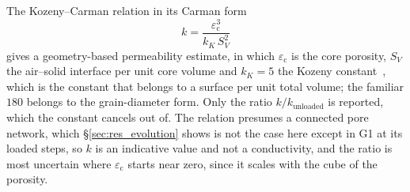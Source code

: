 \documentclass[preprint,12pt,numbers]{elsarticle}
\begin{document}
  The Kozeny--Carman relation in its Carman form
  \begin{equation}
    k = \frac{\varepsilon_\mathrm{c}^3}{k_K\,S_V^2}
    \label{eq:kc}
  \end{equation}
  gives a geometry-based permeability estimate, in which $\varepsilon_\mathrm{c}$ is the
  core porosity, $S_V$ the air--solid interface per unit core volume and
  $k_K = 5$ the Kozeny constant~\cite{Dullien2012}, which is the constant that
  belongs to a surface per unit total volume; the familiar $180$ belongs to the
  grain-diameter form.  Only the ratio $k/k_\mathrm{unloaded}$ is reported,
  which the constant cancels out of.  The relation presumes a connected pore
  network, which \S\ref{sec:res_evolution} shows is not the case here except
  in G1 at its loaded steps, so $k$ is an indicative value and not a
  conductivity, and the ratio is most uncertain where $\varepsilon_\mathrm{c}$
  starts near zero, since it scales with the cube of the porosity.
\end{document}

